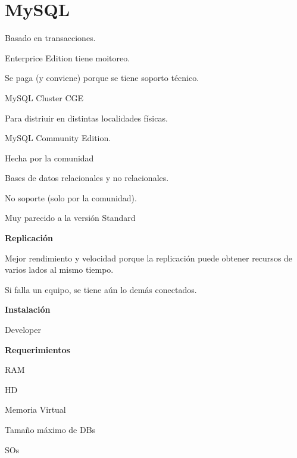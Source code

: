 \documentclass{article}
\begin{document}
\noindent\makebox[\linewidth]{\rule{\paperwidth}{2.0pt}}

\section{MySQL}

Basado en transacciones.

Enterprice Edition tiene moitoreo.

Se paga (y conviene) porque se tiene soporto técnico.

MySQL Cluster CGE

Para distriuir en distintas localidades físicas.

MySQL Community Edition.

Hecha por la comunidad

Bases de datos relacionales y no relacionales.

No soporte (solo por la comunidad).

Muy parecido a la versión Standard

\vspace{1em}
\textbf{Replicación}

Mejor rendimiento y velocidad porque la replicación puede obtener recursos de
varios lados al mismo tiempo.

Si falla un equipo, se tiene aún lo demás conectados.

\vspace{1em}
\textbf{Instalación}

Developer

\vspace{1em}
\textbf{Requerimientos}

RAM

HD

Memoria Virtual

Tamaño máximo de DBs

SOs
\end{document}
